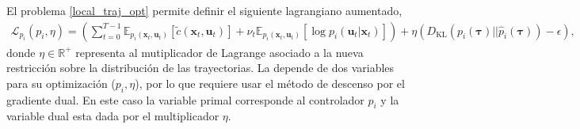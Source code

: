 El problema \ref{local_traj_opt} permite definir el siguiente lagrangiano aumentado, 
\begin{align}
    \mathcal{L}_{p_i}(p_i, \eta) = \left(\sum_{t=0}^{T-1}\mathbb{E}_{p_i(\mathbf{x}_t, \mathbf{u}_t)}[\tilde{c}(\mathbf{x}_t, \mathbf{u}_t)] + \nu_{t}\mathbb{E}_{p_i(\mathbf{x}_t, \mathbf{u}_t)}[\log p_i(\mathbf{u}_t |\mathbf{x}_t)] \right) + \eta  \left(D_{\text{KL}}(p_i(\bm\tau)||\hat{p}_i(\bm\tau))-\epsilon \right),
    \label{eq:local_traj_opt_aug}
\end{align}
donde $\eta \in \mathbb{R}^{+}$ representa al mutiplicador de Lagrange asociado a la nueva restricción sobre la distribución de las trayectorias. La  depende de dos variables para su optimización ($p_i, \eta$), por lo que requiere usar el método de descenso por el gradiente dual. En este caso la variable primal corresponde al controlador $p_i$ y la variable dual esta dada por el multiplicador $\eta$.

